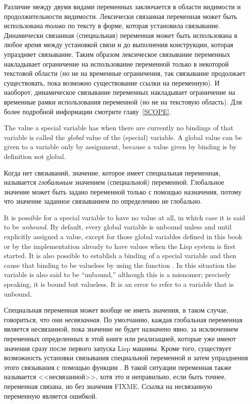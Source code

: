 Различие между двумя видами переменных заключается в области видимости и
продолжительности видимости. Лексически связанная переменная может быть использована
\textit{только} по тексту в форме, которая установила связывание. Динамически
связанная (специальная) переменная может быть использована в любое
\textit{время} между установкой связи и до выполнения конструкции, которая
упраздняет связывание. Таким образом лексическое связывание переменных
накладывает ограничение на использование переменной только в некоторой текстовой
области (но не на временные ограничения, так связывание продолжает существовать,
пока возможно существование ссылки на переменную). И наоборот, динамическое
связывание переменных накладывает ограничение на временные рамки использования
переменной (но не на текстовую область).
Для более подробной информации смотрите главу~\ref{SCOPE}.

The value a special variable has when there are currently
no bindings of that variable is called the \textit{global} value of the
(special) variable.
A global value can be given to a variable only by assignment,
because a value given by binding is by definition not global.

Когда нет связываний, значение, которое имеет специальная
переменная, называется \textit{глобальным} значением (специальной) переменной.
Глобальное значение может быть задано переменной только с помощью назначения,
потому что значение заданное связыванием по определению не глобально.

It is possible for a special variable to have no value at all,
in which case it is said to be \textit{unbound}.
By default, every global variable is unbound unless and until
explicitly assigned a value, except for those global variables
defined in this book or by the implementation already to have values
when the Lisp system is first started.
It is also possible to establish a binding of a special variable
and then cause that binding to be valueless by using the
function .  In this situation the variable
is also said to be ``unbound,'' although this is a misnomer;
precisely speaking, it is bound but valueless.
It is an error to refer to a variable that is unbound.

Специальная переменная может вообще не иметь значения, в таком случае,
говориться, что они \textit{несвязанная}. 
По умолчанию, каждая глобальная переменная является несвязанной, пока значение
не будет назначено явно, за исключением переменных определенных в этой книге или
реализацией, которые уже имеют значения сразу после первого запуска Lisp машины.
Кроме того, существует возможность установки связывания специальной переменной и
затем упразднения этого связывания с помощью функции . В такой
ситуации переменная также называется <<несвязанной>>, хотя это и неправильно,
если быть точнее, переменная связана, но без значения FIXME. Ссылка на несвязанную
переменную является ошибкой.

